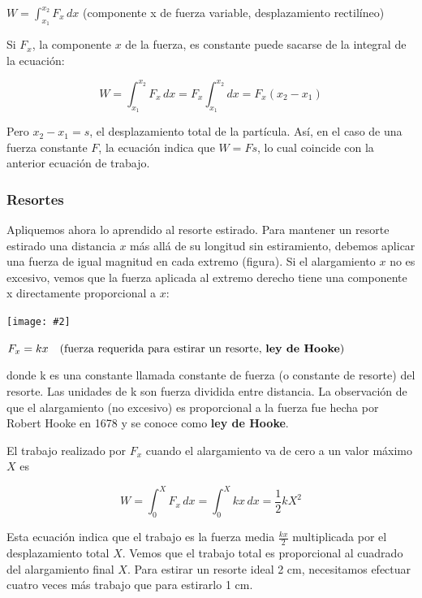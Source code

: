 \documentclass{article}
\newcommand{\newtitle}[1]{
    \color{titleColor}
    \subsubsection{\textbf{#1}}
    \color{black}
}
\newcommand{\bl}[1]{\textbf{#1}}
\newcommand{\definicion}[1]{%
    \vspace{0.5cm}
    \begin{definicionbox}
        #1
    \end{definicionbox}
    \vspace{0.5cm}
}
\newcommand{\ladoALado}[4]{
    \begin{minipage}[t]{#3\textwidth}
        \vspace{0pt}
        #1
    \end{minipage}
    \hfill
    \begin{minipage}[t]{#4\textwidth}
        \vspace{0pt}
        \centering
        \texttt{[image: \#2]}
    \end{minipage}
}
\begin{document}
    \definicion{
        \centering
        \( W = \int_{x_1}^{x_2} F_x \, dx \) \quad (componente x de fuerza variable, desplazamiento rectilíneo)
    }

    \par Si $F_x$, la componente $x$ de la fuerza, es constante puede sacarse de la integral de la ecuación:

    \[ W = \int_{x_1}^{x_2} F_x \, dx = F_x \int_{x_1}^{x_2} dx = F_x (x_2 - x_1) \]

    \par Pero $x_2 - x_1 = s$, el desplazamiento total de la partícula. Así, en el caso de una fuerza constante $F$, la ecuación indica que $W = Fs$, lo cual coincide con la anterior ecuación de trabajo.

    \vspace{0.5cm}

    \newtitle{Resortes}

    \ladoALado{
        \par Apliquemos ahora lo aprendido al resorte estirado. Para mantener un resorte estirado una distancia $x$ más allá de su longitud sin estiramiento, debemos aplicar una fuerza de igual magnitud en cada extremo (figura). Si el alargamiento $x$ no es excesivo, vemos que la fuerza aplicada al extremo derecho tiene una componente x directamente proporcional a $x$:
    }{img/5.3-2.png}{0.6}{0.4}

    \definicion{
        \centering
        \( F_x = k x \quad \text{(fuerza requerida para estirar un resorte, \bl{ley de Hooke})} \)
    }

    \noindent donde k es una constante llamada constante de fuerza (o constante de resorte) del resorte. Las unidades de k son fuerza dividida entre distancia. La observación de que el alargamiento (no excesivo) es proporcional a la fuerza fue hecha por Robert Hooke en 1678 y se conoce como \bl{ley de Hooke}.
    
    \par El trabajo realizado por $F_x$ cuando el alargamiento va de cero a un valor máximo $X$ es

    \[ W = \int_{0}^{X} F_x \, dx = \int_{0}^{X} k x \, dx = \frac{1}{2} k X^2 \]

    \par Esta ecuación indica que el trabajo es la fuerza media $\frac{k x}{2}$ multiplicada por el desplazamiento total $X$. Vemos que el trabajo total es proporcional al cuadrado del alargamiento final $X$. Para estirar un resorte ideal 2 cm, necesitamos efectuar cuatro veces más trabajo que para estirarlo 1 cm.
\end{document}
